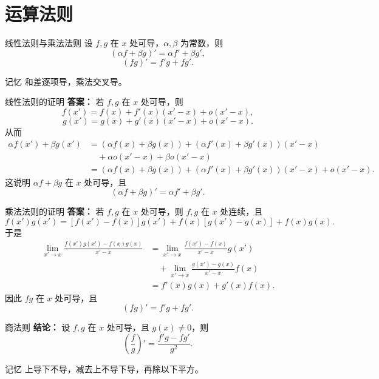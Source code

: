 ﻿\documentclass[aspectratio=169,11pt]{ctexbeamer}
\begin{document}
\section{运算法则}

\begin{frame}{线性法则与乘法法则}
设 $f,g$ 在 $x$ 处可导，$\alpha,\beta$ 为常数，则
\[
(\alpha f+\beta g)'=\alpha f'+\beta g',
\]
\[
(fg)'=f'g+fg'.
\]

\begin{block}{记忆}
和差逐项导，乘法交叉导。
\end{block}
\end{frame}

\begin{frame}{线性法则的证明}
\small
\textbf{答案：} 若 $f,g$ 在 $x$ 处可导，则
\[
f(x')=f(x)+f'(x)(x'-x)+o(x'-x),
\]
\[
g(x')=g(x)+g'(x)(x'-x)+o(x'-x).
\]
从而
\begin{align*}
\alpha f(x')+\beta g(x')
&=(\alpha f(x)+\beta g(x))+(\alpha f'(x)+\beta g'(x))(x'-x)\\
&\quad+\alpha o(x'-x)+\beta o(x'-x)\\
&=(\alpha f(x)+\beta g(x))+(\alpha f'(x)+\beta g'(x))(x'-x)+o(x'-x).
\end{align*}
这说明 $\alpha f+\beta g$ 在 $x$ 处可导，且
\[
(\alpha f+\beta g)'=\alpha f'+\beta g'.
\]
\end{frame}

\begin{frame}{乘法法则的证明}
\small
\textbf{答案：} 若 $f,g$ 在 $x$ 处可导，则 $f,g$ 在 $x$ 处连续，且
\[
f(x')g(x')=[f(x')-f(x)]g(x')+f(x)[g(x')-g(x)]+f(x)g(x).
\]
于是
\begin{align*}
\lim_{x'\to x}\frac{f(x')g(x')-f(x)g(x)}{x'-x}
&=\lim_{x'\to x}\frac{f(x')-f(x)}{x'-x}g(x')\\
&\quad+\lim_{x'\to x}\frac{g(x')-g(x)}{x'-x}f(x)\\
&=f'(x)g(x)+g'(x)f(x).
\end{align*}
因此 $fg$ 在 $x$ 处可导，且
\[
(fg)'=f'g+fg'.
\]
\end{frame}

\begin{frame}{商法则}
\small
\textbf{结论：} 设 $f,g$ 在 $x$ 处可导，且 $g(x)\neq 0$，则
\[
\left(\frac{f}{g}\right)'=\frac{f'g-fg'}{g^2}.
\]

\begin{block}{记忆}
上导下不导，减去上不导下导，再除以下平方。
\end{block}
\end{frame}
\end{document}
